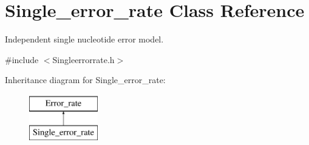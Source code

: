 \hypertarget{classSingle__error__rate}{}\section{Single\+\_\+error\+\_\+rate Class Reference}
\label{classSingle__error__rate}


Independent single nucleotide error model.  




{\ttfamily \#include $<$Singleerrorrate.\+h$>$}

Inheritance diagram for Single\+\_\+error\+\_\+rate\+:\begin{figure}[H]
\begin{center}
\leavevmode
\includegraphics[height=2.000000cm]{d5/de1/classSingle__error__rate}
\end{center}
\end{figure}
